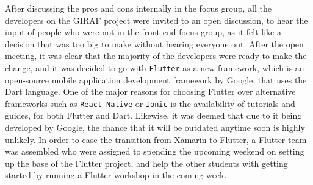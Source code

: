 After discussing the pros and cons internally in the focus group, all the developers on the GIRAF project were invited to an open discussion, to hear the input of people who were not in the front-end focus group, as it felt like a decision that was too big to make without hearing everyone out.
After the open meeting, it was clear that the majority of the developers were ready to make the change, and it was decided to go with \texttt{Flutter} as a new framework, which is an open-source mobile application development framework by Google, that uses the Dart language.
One of the major reasons for choosing Flutter over alternative frameworks such as \texttt{React Native} or \texttt{Ionic} is the availability of tutorials and guides, for both Flutter and Dart. 
Likewise, it was deemed that due to it being developed by Google, the chance that it will be outdated anytime soon is highly unlikely.
In order to ease the transition from Xamarin to Flutter, a Flutter team was assembled who were assigned to spending the upcoming weekend on setting up the base of the Flutter project, and help the other students with getting started by running a Flutter workshop in the coming week.